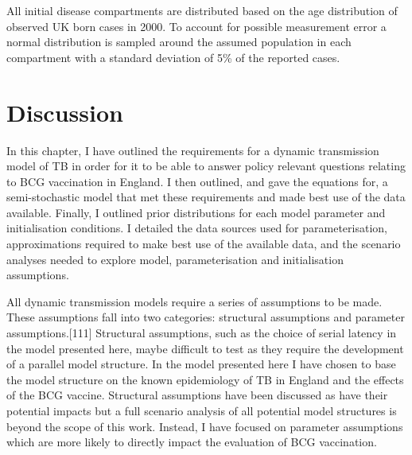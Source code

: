 \documentclass[11pt,twoside]{bristolthesis}
\begin{document}
  All initial disease compartments are distributed based on the age distribution of observed UK born cases in 2000. To account for possible measurement error a normal distribution is sampled around the assumed population in each compartment with a standard deviation of 5\% of the reported cases.
  
  \hypertarget{discussion-4}{%
  \section{Discussion}\label{discussion-4}}
  
  In this chapter, I have outlined the requirements for a dynamic transmission model of TB in order for it to be able to answer policy relevant questions relating to BCG vaccination in England. I then outlined, and gave the equations for, a semi-stochastic model that met these requirements and made best use of the data available. Finally, I outlined prior distributions for each model parameter and initialisation conditions. I detailed the data sources used for parameterisation, approximations required to make best use of the available data, and the scenario analyses needed to explore model, parameterisation and initialisation assumptions.
  
  All dynamic transmission models require a series of assumptions to be made. These assumptions fall into two categories: structural assumptions and parameter assumptions.{[}111{]} Structural assumptions, such as the choice of serial latency in the model presented here, maybe difficult to test as they require the development of a parallel model structure. In the model presented here I have chosen to base the model structure on the known epidemiology of TB in England and the effects of the BCG vaccine. Structural assumptions have been discussed as have their potential impacts but a full scenario analysis of all potential model structures is beyond the scope of this work. Instead, I have focused on parameter assumptions which are more likely to directly impact the evaluation of BCG vaccination.
  
\end{document}

